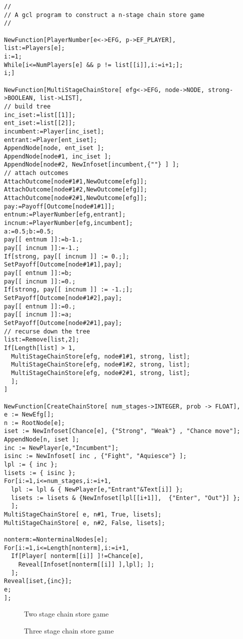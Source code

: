 \begin{verbatim}
//
// A gcl program to construct a n-stage chain store game
//

NewFunction[PlayerNumber[e<->EFG, p->EF_PLAYER],
list:=Players[e];
i:=1;
While[i<=NumPlayers[e] && p != list[[i]],i:=i+1;];
i;]

NewFunction[MultiStageChainStore[ efg<->EFG, node->NODE, strong->BOOLEAN, list->LIST],
// build tree
inc_iset:=list[[1]];
ent_iset:=list[[2]];
incumbent:=Player[inc_iset];
entrant:=Player[ent_iset];
AppendNode[node, ent_iset ];
AppendNode[node#1, inc_iset ];
AppendNode[node#2, NewInfoset[incumbent,{""} ] ];
// attach outcomes 
AttachOutcome[node#1#1,NewOutcome[efg]];
AttachOutcome[node#1#2,NewOutcome[efg]];
AttachOutcome[node#2#1,NewOutcome[efg]];
pay:=Payoff[Outcome[node#1#1]];
entnum:=PlayerNumber[efg,entrant];
incnum:=PlayerNumber[efg,incumbent];
a:=0.5;b:=0.5;
pay[[ entnum ]]:=b-1.;
pay[[ incnum ]]:=-1.;
If[strong, pay[[ incnum ]] := 0.;];
SetPayoff[Outcome[node#1#1],pay];
pay[[ entnum ]]:=b;
pay[[ incnum ]]:=0.;
If[strong, pay[[ incnum ]] := -1.;];
SetPayoff[Outcome[node#1#2],pay];
pay[[ entnum ]]:=0.;
pay[[ incnum ]]:=a;
SetPayoff[Outcome[node#2#1],pay];
// recurse down the tree
list:=Remove[list,2];
If[Length[list] > 1,
  MultiStageChainStore[efg, node#1#1, strong, list];
  MultiStageChainStore[efg, node#1#2, strong, list];
  MultiStageChainStore[efg, node#2#1, strong, list];
  ];
]

NewFunction[CreateChainStore[ num_stages->INTEGER, prob -> FLOAT],
e := NewEfg[];
n := RootNode[e];
iset := NewInfoset[Chance[e], {"Strong", "Weak"} , "Chance move"];
AppendNode[n, iset ];
inc := NewPlayer[e,"Incumbent"];
isinc := NewInfoset[ inc , {"Fight", "Aquiesce"} ];
lpl := { inc };
lisets := { isinc }; 
For[i:=1,i<=num_stages,i:=i+1,
  lpl := lpl & { NewPlayer[e,"Entrant"&Text[i]] };
  lisets := lisets & {NewInfoset[lpl[[i+1]],  {"Enter", "Out"}] };
  ];
MultiStageChainStore[ e, n#1, True, lisets];
MultiStageChainStore[ e, n#2, False, lisets];

nonterm:=NonterminalNodes[e];
For[i:=1,i<=Length[nonterm],i:=i+1,
  If[Player[ nonterm[[i]] ]!=Chance[e],
    Reveal[Infoset[nonterm[[i]] ],lpl]; ];
  ];	
Reveal[iset,{inc}];
e;
];

\end{verbatim}

\newpage
\begin{figure}[h]
\centerline{}
\caption{Two stage chain store game}
\end{figure}

\newpage
\begin{figure}[h]
\centerline{}
\caption{Three stage chain store game}
\end{figure}

